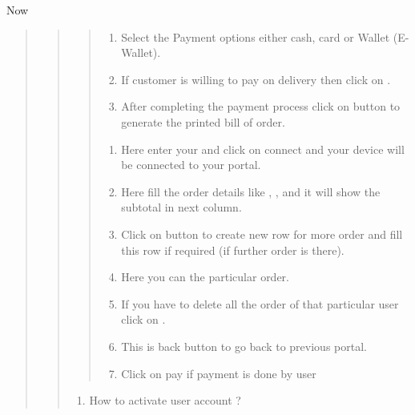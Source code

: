 \documentclass[a4paper,10pt,english]{report}
\begin{document}
Now
\begin{quote}
\begin{quote}
\begin{quote}
\begin{enumerate}
\def\theenumi{\arabic{enumi}}
\def\labelenumi{\theenumi .}
\makeatletter\def\p@enumii{\p@enumi \theenumi .}\makeatother
\item {} 
Select the Payment options either cash, card or Wallet (E-Wallet).

\item {} 
If customer is willing to pay on delivery then click on  .

\item {} 
After completing the payment process click on  button to generate the printed  bill of order.

\end{enumerate}
\begin{enumerate}
\def\theenumi{\arabic{enumi}}
\def\labelenumi{\theenumi .}
\makeatletter\def\p@enumii{\p@enumi \theenumi .}\makeatother
\setcounter{enumi}{1}
\item {} 
Here enter your  and click on connect and your device will be connected to your portal.

\item {} 
Here fill the order details like  ,  ,  and it will show the subtotal in next column.

\item {} 
Click on \sphinxstylestrong{+} button to create new row for more order and fill this row if required (if further order is there).

\item {} 
Here you can  the particular order.

\item {} 
If you have to delete all the order of that particular user click on  .

\item {} 
This is back button to go back to previous portal.

\item {} 
Click on pay if payment is done by user

\end{enumerate}
\end{quote}
\begin{enumerate}
\def\theenumi{\arabic{enumi}}
\def\labelenumi{\theenumi .}
\makeatletter\def\p@enumii{\p@enumi \theenumi .}\makeatother
\setcounter{enumi}{8}
\item {} 
How to activate user account ?


\end{enumerate}
\end{quote}
\end{quote}
\end{document}
